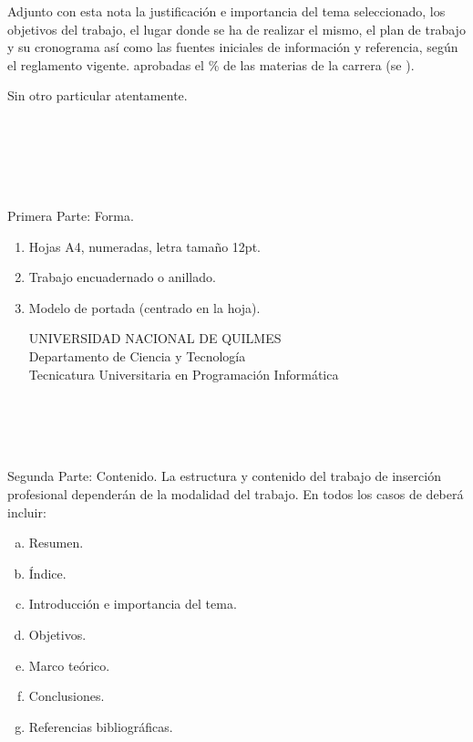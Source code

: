 Adjunto con esta nota la justificación e importancia del tema
seleccionado, los objetivos del trabajo, el lugar donde se ha de realizar el
mismo, el plan de trabajo y su cronograma así como las fuentes iniciales de
información y referencia, según el reglamento vigente. 
aprobadas el \%  de las materias de la carrera (se
).

Sin otro particular  atentamente.\\ \\
\\
\\
\\
\\

\newpage
{}

Primera Parte: Forma.
\begin{enumerate}
\item Hojas A4, numeradas, letra tamaño 12pt.
\item Trabajo encuadernado o anillado.
\item Modelo de portada (centrado en la hoja).
\begin{center}
UNIVERSIDAD NACIONAL DE QUILMES\\
Departamento de Ciencia y Tecnología\\
Tecnicatura Universitaria en Programación Informática\\

\\
\\
\\
\\
\end{center}
\end{enumerate}

Segunda Parte: Contenido.
La estructura y contenido del trabajo de inserción profesional dependerán de la
modalidad del trabajo. En todos los casos de deberá incluir:
\begin{enumerate}[a.]
\item Resumen.
\item Índice.
\item Introducción e importancia del tema.
\item Objetivos.
\item Marco teórico.
\item Conclusiones.
\item Referencias bibliográficas.
\end{enumerate}

